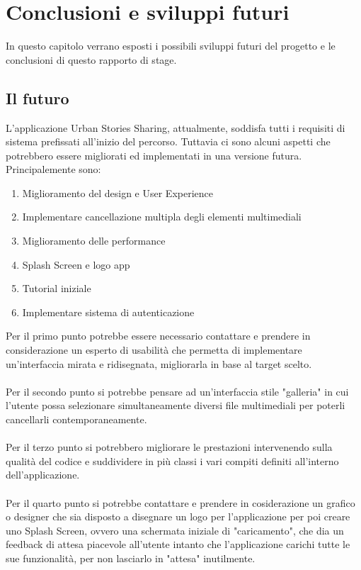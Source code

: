 \chapter{Conclusioni e sviluppi futuri}
\label{chapter4}
In questo capitolo verrano esposti i possibili  sviluppi futuri del progetto e le conclusioni di questo rapporto di stage.

\section{Il futuro}
L'applicazione Urban Stories Sharing, attualmente, soddisfa tutti i requisiti di sistema prefissati all'inizio del percorso. Tuttavia ci sono alcuni aspetti che potrebbero essere migliorati ed implementati in una versione futura.
\\Principalemente sono:
\begin{enumerate}
    \item Miglioramento del design e User Experience
    \item Implementare cancellazione multipla degli elementi multimediali
    \item Miglioramento delle performance
    \item Splash Screen e logo app
    \item Tutorial iniziale
    \item Implementare sistema di autenticazione
\end{enumerate}
Per il primo punto potrebbe essere necessario contattare e prendere in considerazione un esperto di usabilità che permetta di implementare un'interfaccia mirata e ridisegnata, migliorarla in base al target scelto.
\\\\Per il secondo punto si potrebbe pensare ad un'interfaccia stile "galleria" in cui l'utente possa selezionare simultaneamente diversi file multimediali per poterli cancellarli contemporaneamente.
\\\\Per il terzo punto si potrebbero migliorare le prestazioni intervenendo sulla qualità del codice e suddividere in più classi i vari compiti definiti all'interno dell'applicazione.
\\\\Per il quarto punto si potrebbe contattare e prendere in cosiderazione un grafico o designer che sia disposto a disegnare un logo per l'applicazione per poi creare uno Splash Screen, ovvero una schermata iniziale di "caricamento", che dia un feedback di attesa piacevole all'utente intanto che l'applicazione carichi tutte le sue funzionalità, per non lasciarlo in "attesa" inutilmente.
